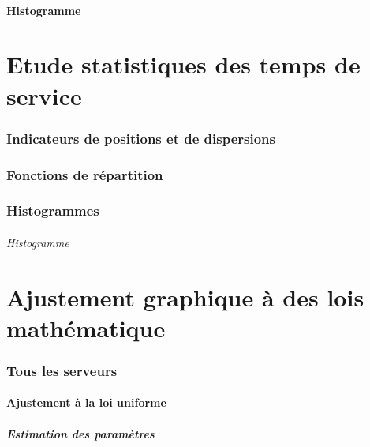 \documentclass{article}
\begin{document}
\subsection{Histogramme}

\part{Etude statistiques des temps de service}

\section{Indicateurs de positions et de dispersions}

\section{Fonctions de répartition}

\section{Histogrammes}

\paragraph{Histogramme}
\begin{center}
\end{center}
\paragraph{}

\part{Ajustement graphique à des lois mathématique}

\section{Tous les serveurs}

\subsection{Ajustement à la loi uniforme}

\subsubsection{Estimation des paramètres}
\end{document}

